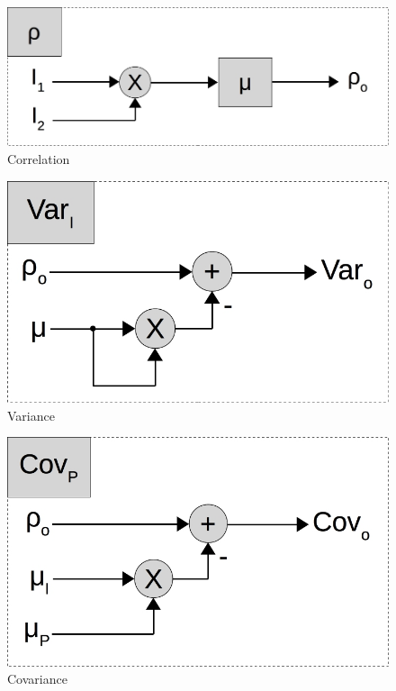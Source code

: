 \begin{figure}[ht!]
  \centering
  \includegraphics[scale=0.3]{figures/rho}
  \caption{Correlation}
  \label{fig:rho}
\end{figure}

\begin{figure}[ht!]
  \centering
  \includegraphics[scale=0.3]{figures/var_par}
  \caption{Variance}
  \label{fig:var_par}
\end{figure}

\begin{figure}[ht!]
  \centering
  \includegraphics[scale=0.3]{figures/cov_par}
  \caption{Covariance}
  \label{fig:cov_par}
\end{figure}

